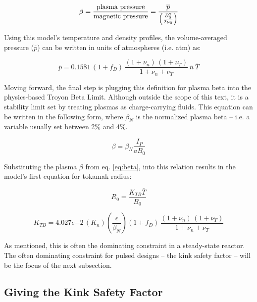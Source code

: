 \begin{equation}
	\label{eq:beta}
	\beta = \frac{\textnormal{plasma pressure}}{\textnormal{magnetic pressure}} = \frac{ \overline p }{ \left( \frac{B_0^2}{2 \mu_0} \right) }
\end{equation}

Using this model's temperature and density profiles, the volume-averaged pressure ($\overline p$) can be written in units of atmospheres (i.e. atm) as:

\begin{equation}
  \overline{p} = 0.1581 \, ( 1 + f_D ) \, \frac{ (1 + \nu_n) \, (1 + \nu_T) }{1 + \nu_n + \nu_T } \, \overline{n} \ \overline{T}
\end{equation}

Moving forward, the final step is plugging this definition for plasma beta into the physics-based Troyon Beta Limit. Although outside the scope of this text, it is a stability limit set by treating plasmas as charge-carrying fluids. This equation can be written in the following form, where $\beta_N$ is the normalized plasma beta -- i.e. a  variable usually set between 2\% and 4\%. \cite{hartmann}

\begin{equation}
	\beta = \beta_N \frac{ I_P }{ a B_0 }
\end{equation}

Substituting the plasma $\beta$ from eq. \ref{eq:beta}, into this relation results in the model's first equation for tokamak radius:

\begin{equation}
  \label{eq:r_beta}
  R_0 = \frac{ K_{TB} \overline{T} }{ B_0 }
\end{equation}

\begin{equation}
  K_{TB} = 4.027e{-2} \, ( K_n ) \left( \frac{\epsilon}{\beta_N} \right)  ( 1 + f_D ) \, \frac{ (1 + \nu_n) \, (1 + \nu_T) }{1 + \nu_n + \nu_T }
\end{equation}

As mentioned, this is often the dominating constraint in a steady-state reactor. The often dominating constraint for pulsed designs -- the kink safety factor -- will be the focus of the next subsection.

\subsection{Giving the Kink Safety Factor}

